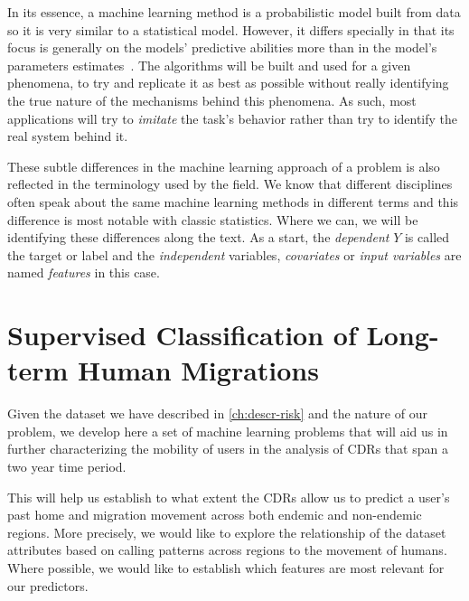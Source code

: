 In its essence, a machine learning method is a probabilistic model built from data so it is very similar to a statistical model. However, it differs specially in that its focus is generally on the models' predictive abilities more than in the model's parameters estimates~\textcite{breiman-statisticalmodeling}. The algorithms will be built and used for a given phenomena, to try and replicate it as best as possible without really identifying the true nature of the mechanisms behind this phenomena. As such, most applications will try to \textit{imitate} the task's behavior rather than try to identify the real system behind it.


These subtle differences in the machine learning approach of a problem is also reflected in the terminology used by the field. We know that different disciplines often speak about the same machine learning methods in different terms and this difference is most notable with classic statistics. Where we can, we will be identifying these differences along the text. As a start, the \textit{dependent} $Y$ is called the target or label and the \textit{independent} variables, \textit{covariates} or \textit{input variables} are named \textit{features} in this case.

\section{Supervised Classification of Long-term Human Migrations}\label{long_term}

Given the dataset we have described in \cref{ch:descr-risk} and the nature of our problem, we develop here a set of machine learning problems that will aid us in further characterizing the mobility of users in the analysis of CDRs that span a two year time period.

This will help us establish to what extent the CDRs allow us to predict a user's past home and migration movement across both endemic and non-endemic regions.
More precisely, we would like to explore the relationship of the dataset attributes based on calling patterns across regions to the movement of humans.
Where possible, we would like to establish which features are most relevant for our predictors.

